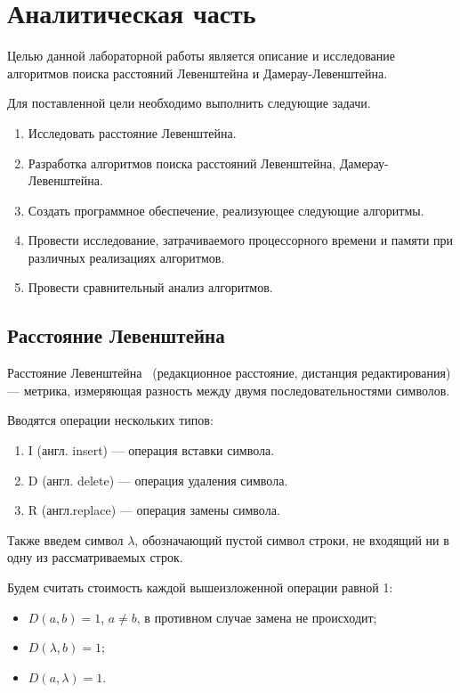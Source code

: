 \chapter{Аналитическая часть}
\label{sec:targets}
Целью данной лабораторной работы является описание и исследование алгоритмов поиска расстояний Левенштейна и Дамерау-Левенштейна.


Для поставленной цели необходимо выполнить следующие задачи.
\begin{enumerate}[label={\arabic*)}]
	\item Исследовать расстояние Левенштейна.
	\item Разработка алгоритмов поиска расстояний Левенштейна, Дамерау-Левенштейна.
	\item Создать программное обеспечение, реализующее следующие алгоритмы.
	\item Провести исследование, затрачиваемого процессорного времени и памяти при различных реализациях алгоритмов.
	\item Провести сравнительный анализ алгоритмов.
\end{enumerate}

\section{Расстояние Левенштейна}


Расстояние Левенштейна~\cite{levenshtein} (редакционное расстояние, дистанция редактирования) --- метрика, измеряющая разность между двумя последовательностями символов.

Вводятся операции нескольких типов:
\begin{enumerate}[label=\arabic*]
	\item I (англ. insert) --- операция вставки символа.
	\item D (англ. delete) --- операция удаления символа.
	\item R (англ.replace) --- операция замены символа.
\end{enumerate}
Также введем символ $\lambda$, обозначающий пустой символ строки, не входящий ни в одну из рассматриваемых строк.

Будем считать стоимость каждой вышеизложенной операции равной 1:
\begin{itemize}[label=---]
	\item $D(a, b) = 1$, $a \neq b$, в противном случае замена не происходит;
	\item $D(\lambda, b) = 1$;
	\item $D(a, \lambda) = 1$.
\end{itemize}


